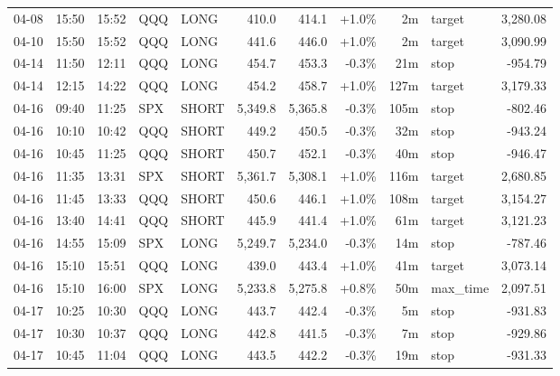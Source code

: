\documentclass[11pt,a4paper,twoside]{article}
\begin{document}
\begin{center}
\begin{longtable}{>{\color{txtmain}}l l l l l r r r r >{\color{txtmain}}l r}
04-08 & 15:50 & 15:52 & QQQ & LONG & 410.0 & 414.1 & \textcolor{wingreen}{+1.0\%} & 2m & target & \textcolor{wingreen}{3,280.08} \\
04-10 & 15:50 & 15:52 & QQQ & LONG & 441.6 & 446.0 & \textcolor{wingreen}{+1.0\%} & 2m & target & \textcolor{wingreen}{3,090.99} \\
04-14 & 11:50 & 12:11 & QQQ & LONG & 454.7 & 453.3 & \textcolor{lossred}{-0.3\%} & 21m & stop & \textcolor{lossred}{-954.79} \\
04-14 & 12:15 & 14:22 & QQQ & LONG & 454.2 & 458.7 & \textcolor{wingreen}{+1.0\%} & 127m & target & \textcolor{wingreen}{3,179.33} \\
04-16 & 09:40 & 11:25 & SPX & SHORT & 5,349.8 & 5,365.8 & \textcolor{lossred}{-0.3\%} & 105m & stop & \textcolor{lossred}{-802.46} \\
04-16 & 10:10 & 10:42 & QQQ & SHORT & 449.2 & 450.5 & \textcolor{lossred}{-0.3\%} & 32m & stop & \textcolor{lossred}{-943.24} \\
04-16 & 10:45 & 11:25 & QQQ & SHORT & 450.7 & 452.1 & \textcolor{lossred}{-0.3\%} & 40m & stop & \textcolor{lossred}{-946.47} \\
04-16 & 11:35 & 13:31 & SPX & SHORT & 5,361.7 & 5,308.1 & \textcolor{wingreen}{+1.0\%} & 116m & target & \textcolor{wingreen}{2,680.85} \\
04-16 & 11:45 & 13:33 & QQQ & SHORT & 450.6 & 446.1 & \textcolor{wingreen}{+1.0\%} & 108m & target & \textcolor{wingreen}{3,154.27} \\
04-16 & 13:40 & 14:41 & QQQ & SHORT & 445.9 & 441.4 & \textcolor{wingreen}{+1.0\%} & 61m & target & \textcolor{wingreen}{3,121.23} \\
04-16 & 14:55 & 15:09 & SPX & LONG & 5,249.7 & 5,234.0 & \textcolor{lossred}{-0.3\%} & 14m & stop & \textcolor{lossred}{-787.46} \\
04-16 & 15:10 & 15:51 & QQQ & LONG & 439.0 & 443.4 & \textcolor{wingreen}{+1.0\%} & 41m & target & \textcolor{wingreen}{3,073.14} \\
04-16 & 15:10 & 16:00 & SPX & LONG & 5,233.8 & 5,275.8 & \textcolor{wingreen}{+0.8\%} & 50m & max\_time & \textcolor{wingreen}{2,097.51} \\
04-17 & 10:25 & 10:30 & QQQ & LONG & 443.7 & 442.4 & \textcolor{lossred}{-0.3\%} & 5m & stop & \textcolor{lossred}{-931.83} \\
04-17 & 10:30 & 10:37 & QQQ & LONG & 442.8 & 441.5 & \textcolor{lossred}{-0.3\%} & 7m & stop & \textcolor{lossred}{-929.86} \\
04-17 & 10:45 & 11:04 & QQQ & LONG & 443.5 & 442.2 & \textcolor{lossred}{-0.3\%} & 19m & stop & \textcolor{lossred}{-931.33} \\

\end{longtable}
\end{center}
\end{document}

